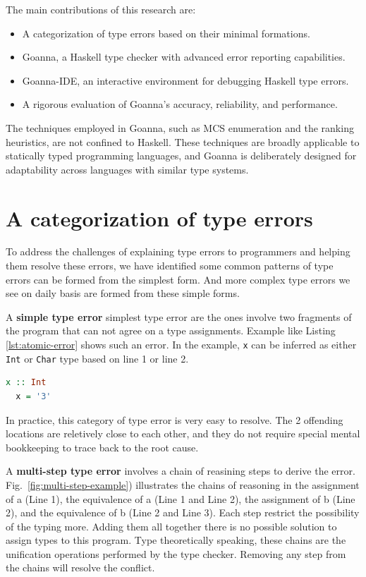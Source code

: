 \documentclass[pdflatex,sn-mathphys-num]{sn-jnl}%
\begin{document}
The main contributions of this research are:
\begin{itemize}
    \item A categorization of type errors based on their minimal formations.
    \item Goanna, a Haskell type checker with advanced error reporting capabilities.
    \item Goanna-IDE, an interactive environment for debugging Haskell type errors.
    \item A rigorous evaluation of Goanna's accuracy, reliability, and performance.
\end{itemize}

The techniques employed in Goanna, such as MCS enumeration and the  ranking heuristics, are not confined to Haskell. These techniques are broadly applicable to statically typed programming languages, and Goanna is deliberately designed for adaptability across languages with similar type systems.

\section*{A categorization of type errors} \label{sec:category}

To address the challenges of explaining type errors to programmers and helping them resolve these errors, we have identified some common patterns of type errors can be formed from the simplest form. And more complex type errors we see on daily basis are formed from these simple forms.

A \textbf{simple type error} simplest type error are the ones involve two fragments of the program that can not agree on a type assignments. Example like Listing \ref{lst:atomic-error} shows such an error. In the example, {\tt x} can be inferred as either {\tt Int} or {\tt Char} type based on line 1 or line 2. 

\begin{lstlisting}[language=Haskell, caption=The simplest form of type error, label={lst:atomic-error}]
  x :: Int
  x = '3'
\end{lstlisting}

In practice, this category of type error is very easy to resolve. The 2 offending locations are reletively close to each other, and they do not require special mental bookkeeping to trace back to the root cause. 


A \textbf{multi-step type error} involves a chain of reasining steps to derive the error. Fig.~\ref{fig:multi-step-example}) illustrates the chains of reasoning in the assignment of a (Line 1), the equivalence of a (Line 1 and Line 2), the assignment of b (Line 2), and the equivalence of b (Line 2 and Line 3). Each step restrict the possibility of the typing more. Adding them all together there is no possible solution to assign types to this program. Type theoretically speaking, these chains are the unification operations performed by the type checker. Removing any step from the chains will resolve the conflict.
\end{document}
